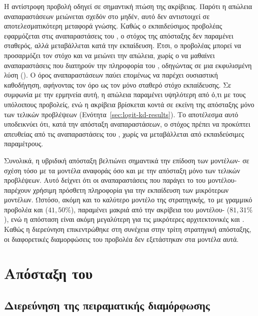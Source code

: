Η αντίστροφη προβολή οδηγεί σε σημαντική πτώση της ακρίβειας. Παρότι η
απώλεια αναπαραστάσεων μειώνεται σχεδόν στο μηδέν, αυτό δεν αντιστοιχεί
σε αποτελεσματικότερη μεταφορά γνώσης. Καθώς ο εκπαιδεύσιμος προβολέας
εφαρμόζεται στις αναπαραστάσεις του , ο στόχος της
απόσταξης δεν παραμένει σταθερός, αλλά μεταβάλλεται κατά την εκπαίδευση.
Έτσι, ο προβολέας μπορεί να προσαρμόζει τον στόχο και να μειώνει την
απώλεια, χωρίς ο  να μαθαίνει αναπαραστάσεις που διατηρούν
την πληροφορία του , οδηγώντας σε μια εκφυλισμένη λύση
(). Ο όρος αναπαραστάσεων παύει επομένως να
παρέχει ουσιαστική καθοδήγηση, αφήνοντας τον όρο  ως τον μόνο
σταθερό στόχο εκπαίδευσης. Σε συμφωνία με την ερμηνεία αυτή, η απώλεια
 παραμένει υψηλότερη από ό,τι με τους υπόλοιπους προβολείς, ενώ
η ακρίβεια βρίσκεται κοντά σε εκείνη της απόσταξης μόνο των τελικών
προβλέψεων (Ενότητα~\ref{sec:logit-kd-results}). Το αποτέλεσμα αυτό
υποδεικνύει ότι, κατά την απόσταξη αναπαραστάσεων, ο στόχος πρέπει να
προκύπτει απευθείας από τις αναπαραστάσεις του , χωρίς να
μεταβάλλεται από εκπαιδεύσιμες παραμέτρους.


Συνολικά, η υβριδική απόσταξη βελτιώνει σημαντικά την επίδοση των
μοντέλων- σε σχέση τόσο με τα μοντέλα αναφοράς όσο και με
την απόσταξη μόνο των τελικών προβλέψεων. Αυτό δείχνει ότι οι αναπαραστάσεις που παράγει το 
 του μοντέλου- παρέχουν
χρήσιμη πρόσθετη πληροφορία για την εκπαίδευση των μικρότερων
μοντέλων. Ωστόσο, ακόμη και το καλύτερο μοντέλο της στρατηγικής, το
 με γραμμικό προβολέα και 
(\(41{,}50\%\)), παραμένει μακριά από την ακρίβεια του
μοντέλου- (\(81{,}31\%\)), ενώ η απόσταση είναι ακόμη
μεγαλύτερη για τις μικρότερες αρχιτεκτονικές  και
. Καθώς η διερεύνηση επικεντρώθηκε στη
συνέχεια στην τρίτη στρατηγική απόσταξης, οι διαφορετικές διαμορφώσεις
του προβολέα δεν εξετάστηκαν στα μοντέλα αυτά.

\section{Απόσταξη του }
\label{sec:backbone-kd}

\subsection{Διερεύνηση της πειραματικής διαμόρφωσης}
\label{subsec:backbone-kd-exploration}

